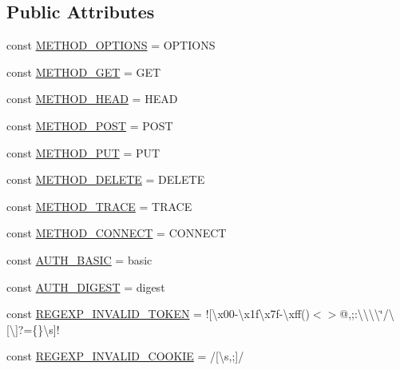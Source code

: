 \subsection*{Public Attributes}
\begin{DoxyCompactItemize}
\item 
const \hyperlink{classHTTP__Request2_a65c57cec36149d220f6cd30d43eb59b7}{M\+E\+T\+H\+O\+D\+\_\+\+O\+P\+T\+I\+O\+N\+S} = \textquotesingle{}O\+P\+T\+I\+O\+N\+S\textquotesingle{}
\item 
const \hyperlink{classHTTP__Request2_a7c1f37cc2543c9d0fe5f09086bd50b3a}{M\+E\+T\+H\+O\+D\+\_\+\+G\+E\+T} = \textquotesingle{}G\+E\+T\textquotesingle{}
\item 
const \hyperlink{classHTTP__Request2_abb68a728946a9da5f19d5bb0cf676d58}{M\+E\+T\+H\+O\+D\+\_\+\+H\+E\+A\+D} = \textquotesingle{}H\+E\+A\+D\textquotesingle{}
\item 
const \hyperlink{classHTTP__Request2_ae42a6ae396ef8abacf8e54a64a64df22}{M\+E\+T\+H\+O\+D\+\_\+\+P\+O\+S\+T} = \textquotesingle{}P\+O\+S\+T\textquotesingle{}
\item 
const \hyperlink{classHTTP__Request2_a02fd90821d762476b8ec1e226c374174}{M\+E\+T\+H\+O\+D\+\_\+\+P\+U\+T} = \textquotesingle{}P\+U\+T\textquotesingle{}
\item 
const \hyperlink{classHTTP__Request2_ab6edf309179aa4535aa6a9b12b260978}{M\+E\+T\+H\+O\+D\+\_\+\+D\+E\+L\+E\+T\+E} = \textquotesingle{}D\+E\+L\+E\+T\+E\textquotesingle{}
\item 
const \hyperlink{classHTTP__Request2_a9877a1980431a869bce427ec64c923eb}{M\+E\+T\+H\+O\+D\+\_\+\+T\+R\+A\+C\+E} = \textquotesingle{}T\+R\+A\+C\+E\textquotesingle{}
\item 
const \hyperlink{classHTTP__Request2_af03c573103c3f5bdf3ec9c3e95a08e59}{M\+E\+T\+H\+O\+D\+\_\+\+C\+O\+N\+N\+E\+C\+T} = \textquotesingle{}C\+O\+N\+N\+E\+C\+T\textquotesingle{}
\item 
const \hyperlink{classHTTP__Request2_a2282d82f67f929d936b2b2b6c2317dd1}{A\+U\+T\+H\+\_\+\+B\+A\+S\+I\+C} = \textquotesingle{}basic\textquotesingle{}
\item 
const \hyperlink{classHTTP__Request2_a4b05b6842e05183dc3ac3c7ff613b3c7}{A\+U\+T\+H\+\_\+\+D\+I\+G\+E\+S\+T} = \textquotesingle{}digest\textquotesingle{}
\item 
const \hyperlink{classHTTP__Request2_a73691a6fc7003599b47be20a8c728bbf}{R\+E\+G\+E\+X\+P\+\_\+\+I\+N\+V\+A\+L\+I\+D\+\_\+\+T\+O\+K\+E\+N} = \textquotesingle{}!\mbox{[}\textbackslash{}x00-\/\textbackslash{}x1f\textbackslash{}x7f-\/\textbackslash{}xff()$<$$>$@,;\+:\textbackslash{}\textbackslash{}\textbackslash{}\textbackslash{}\char`\"{}/\textbackslash{}\mbox{[}\textbackslash{}\mbox{]}?=\{\}\textbackslash{}s\mbox{]}!\textquotesingle{}
\item 
const \hyperlink{classHTTP__Request2_ab7fc574a0035ac8e940f6cd3456b0c28}{R\+E\+G\+E\+X\+P\+\_\+\+I\+N\+V\+A\+L\+I\+D\+\_\+\+C\+O\+O\+K\+I\+E} = \textquotesingle{}/\mbox{[}\textbackslash{}s,;\mbox{]}/\textquotesingle{}
\end{DoxyCompactItemize}
